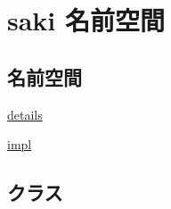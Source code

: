 \hypertarget{namespacesaki}{}\section{saki 名前空間}
\label{namespacesaki}
\subsection*{名前空間}
\begin{DoxyCompactItemize}
\item 
 \mbox{\hyperlink{namespacesaki_1_1details}{details}}
\item 
 \mbox{\hyperlink{namespacesaki_1_1impl}{impl}}
\end{DoxyCompactItemize}
\subsection*{クラス}
